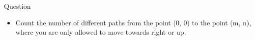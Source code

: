 \begin{frame}{Question}
    \begin{itemize}
        \item Count the number of different paths from the point (0, 0) to the point (m, n), where you are only allowed to move towards right or up.
    \end{itemize}
\end{frame}